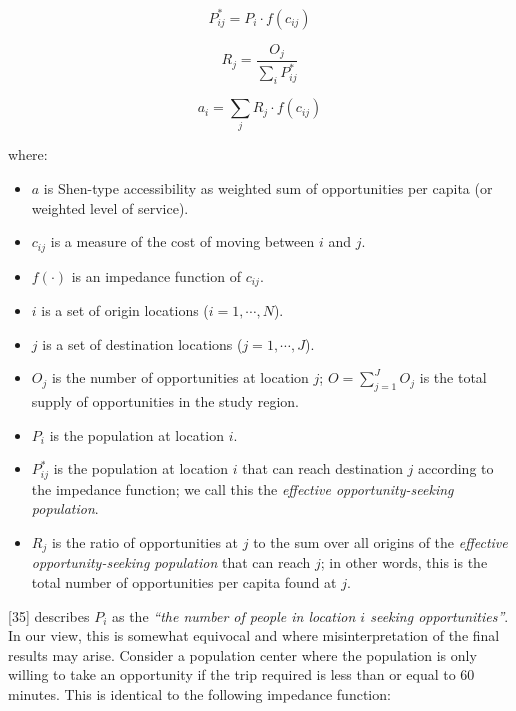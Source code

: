 \documentclass[10pt,letterpaper]{article}
\providecommand{\tightlist}{%
  \setlength{\itemsep}{0pt}\setlength{\parskip}{0pt}}
\begin{document}
\begin{equation}
\label{eq:effective-opportunity-seeking-population}
P_{ij}^{*} = {P_{i} \cdot f(c_{ij})}
\end{equation}

\begin{equation}
\label{eq:level-of-service}
R_{j} = \frac{O_{j}}{\sum_i P_{ij}^*}
\end{equation}

\begin{equation}
\label{eq:2SFCA-step2}
a_{i} = {\sum_j R_{j} \cdot f(c_{ij})}
\end{equation}

\noindent where:

\begin{itemize}
\tightlist
\item
  \(a\) is Shen-type accessibility as weighted sum of opportunities per
  capita (or weighted level of service).
\item
  \(c_{ij}\) is a measure of the cost of moving between \(i\) and \(j\).
\item
  \(f(\cdot)\) is an impedance function of \(c_{ij}\).
\item
  \(i\) is a set of origin locations (\(i = 1,\cdots,N\)).
\item
  \(j\) is a set of destination locations (\(j = 1,\cdots,J\)).
\item
  \(O_j\) is the number of opportunities at location \(j\);
  \(O = \sum_{j=1}^J O_j\) is the total supply of opportunities in the
  study region.
\item
  \(P_i\) is the population at location \(i\).
\item
  \(P_{ij}^*\) is the population at location \(i\) that can reach
  destination \(j\) according to the impedance function; we call this
  the \emph{effective opportunity-seeking population}.
\item
  \(R_j\) is the ratio of opportunities at \(j\) to the sum over all
  origins of the \emph{effective opportunity-seeking population} that
  can reach \(j\); in other words, this is the total number of
  opportunities per capita found at \(j\).
\end{itemize}

{[}35{]} describes \(P_i\) as the \emph{``the number of people in
location \(i\) seeking opportunities''}. In our view, this is somewhat
equivocal and where misinterpretation of the final results may arise.
Consider a population center where the population is only willing to
take an opportunity if the trip required is less than or equal to 60
minutes. This is identical to the following impedance function:
\end{document}
